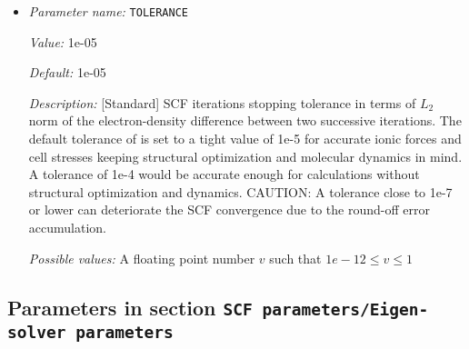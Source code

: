 \begin{itemize}
{\it Value:} 500.0


{\it Default:} 500.0


{\it Description:} [Standard] Fermi-Dirac smearing temperature (in Kelvin).


{\it Possible values:} A floating point number $v$ such that $1e-05 \leq v \leq \text{MAX\_DOUBLE}$
\item {\it Parameter name:} {\tt TOLERANCE}
\label{parameters:SCF parameters/TOLERANCE}
\label{parameters:SCF_20parameters/TOLERANCE}


{\it Value:} 1e-05


{\it Default:} 1e-05


{\it Description:} [Standard] SCF iterations stopping tolerance in terms of $L_2$ norm of the electron-density difference between two successive iterations. The default tolerance of is set to a tight value of 1e-5 for accurate ionic forces and cell stresses keeping structural optimization and molecular dynamics in mind. A tolerance of 1e-4 would be accurate enough for calculations without structural optimization and dynamics. CAUTION: A tolerance close to 1e-7 or lower can deteriorate the SCF convergence due to the round-off error accumulation.


{\it Possible values:} A floating point number $v$ such that $1e-12 \leq v \leq 1$
\end{itemize}



\subsection{Parameters in section \tt SCF parameters/Eigen-solver parameters}
\label{parameters:SCF_20parameters/Eigen_2dsolver_20parameters}

